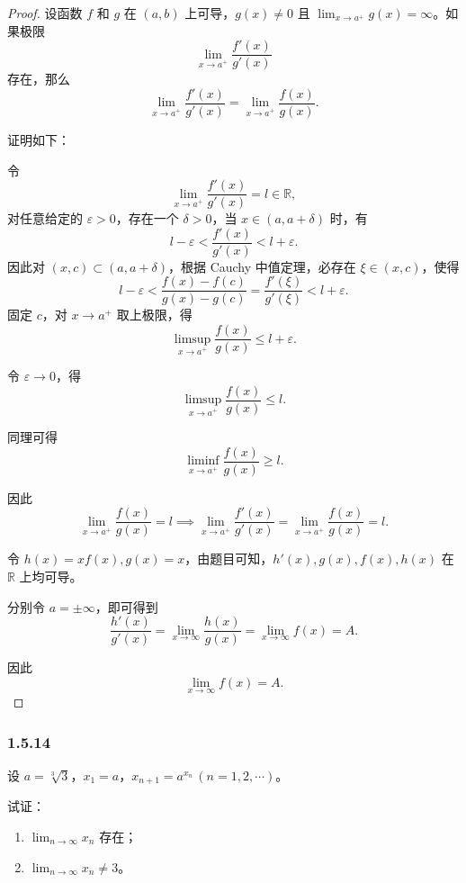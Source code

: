 \documentclass[12pt]{ctexart}
\begin{document}
\begin{proof}
设函数 $f$ 和 $g$ 在 $(a, b)$ 上可导，$g(x) \neq 0$ 且 $\lim_{x \to a^+} g(x) = \infty$。如果极限
\[
\lim_{x \to a^+} \frac{f'(x)}{g'(x)}
\]
存在，那么
\[
\lim_{x \to a^+} \frac{f'(x)}{g'(x)} = \lim_{x \to a^+} \frac{f(x)}{g(x)}.
\]

证明如下：

令
\[
\lim_{x \to a^+} \frac{f'(x)}{g'(x)} = l \in \mathbb{R},
\]
对任意给定的 $\varepsilon > 0$，存在一个 $\delta > 0$，当 $x \in (a, a + \delta)$ 时，有
\[
l - \varepsilon < \frac{f'(x)}{g'(x)} < l + \varepsilon.
\]
因此对 $(x, c) \subset (a, a + \delta)$，根据 Cauchy 中值定理，必存在 $\xi \in (x, c)$，使得
\[
l - \varepsilon < \frac{f(x) - f(c)}{g(x) - g(c)} = \frac{f'(\xi)}{g'(\xi)} < l + \varepsilon.
\]
固定 $c$，对 $x \to a^+$ 取上极限，得
\[
\limsup_{x \to a^+} \frac{f(x)}{g(x)} \leq l + \varepsilon.
\]

令 $\varepsilon \to 0$，得
\[
\limsup_{x \to a^+} \frac{f(x)}{g(x)} \leq l.
\]

同理可得
\[
\liminf_{x \to a^+} \frac{f(x)}{g(x)} \geq l.
\]

因此
\[
\lim_{x \to a^+} \frac{f(x)}{g(x)} = l \implies \lim_{x \to a^+} \frac{f'(x)}{g'(x)} = \lim_{x \to a^+} \frac{f(x)}{g(x)} = l.
\]

令 $h(x) = x f(x), g(x) = x$，由题目可知，$h'(x), g(x), f(x), h(x)$ 在 $\mathbb{R}$ 上均可导。

分别令 $a = \pm \infty$，即可得到
\[
\frac{h'(x)}{g'(x)} = \lim_{x \to \infty} \frac{h(x)}{g(x)} = \lim_{x \to \infty} f(x) = A.
\]

因此
\[
\lim_{x \to \infty} f(x) = A.
\]
\end{proof}

\subsubsection*{1.5.14}

设 $a = \sqrt[3]{3}$，$x_1 = a$，$x_{n+1} = a^{x_n} \, (n = 1, 2, \cdots)$。

试证：
\begin{enumerate}
    \item $\lim_{n \to \infty} x_n$ 存在；
    \item $\lim_{n \to \infty} x_n \neq 3$。
\end{enumerate}
\end{document}
